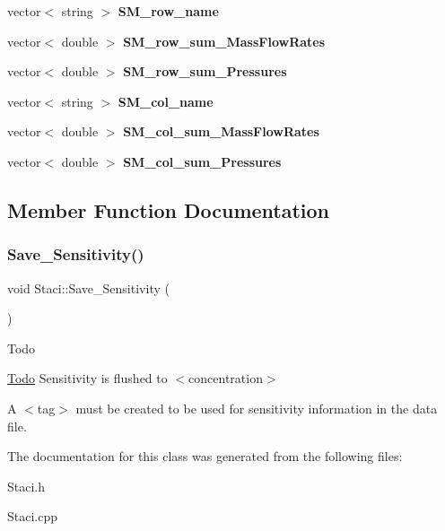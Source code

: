 \begin{DoxyCompactItemize}
vector$<$ string $>$ {\bfseries S\+M\+\_\+row\+\_\+name}
\item 
\mbox{\label{class_staci_a7b12823f45158095f1dada4da44196a5}} 
vector$<$ double $>$ {\bfseries S\+M\+\_\+row\+\_\+sum\+\_\+\+Mass\+Flow\+Rates}
\item 
\mbox{\label{class_staci_a3583d4f48a560fc7d690ce23bf2a0b99}} 
vector$<$ double $>$ {\bfseries S\+M\+\_\+row\+\_\+sum\+\_\+\+Pressures}
\item 
\mbox{\label{class_staci_a65be5fdc061a8b906b12758fae210cef}} 
vector$<$ string $>$ {\bfseries S\+M\+\_\+col\+\_\+name}
\item 
\mbox{\label{class_staci_a88c1be986fb791fc2d6dcf188e492ee4}} 
vector$<$ double $>$ {\bfseries S\+M\+\_\+col\+\_\+sum\+\_\+\+Mass\+Flow\+Rates}
\item 
\mbox{\label{class_staci_af7abda3370dc818d72e570aa2f5e9225}} 
vector$<$ double $>$ {\bfseries S\+M\+\_\+col\+\_\+sum\+\_\+\+Pressures}
\end{DoxyCompactItemize}


\subsection{Member Function Documentation}
\mbox{\label{class_staci_adfa2f37ff32dedbb4f71df48951ed786}} 
\subsubsection{\texorpdfstring{Save\+\_\+\+Sensitivity()}{Save\_Sensitivity()}}
{\footnotesize\ttfamily void Staci\+::\+Save\+\_\+\+Sensitivity (\begin{DoxyParamCaption}{ }\end{DoxyParamCaption})}

\begin{DoxyRefDesc}{Todo}
\item[\hyperlink{todo__todo000001}{Todo}]Sensitivity is flushed to $<$concentration$>$\end{DoxyRefDesc}


A $<$tag$>$ must be created to be used for sensitivity information in the data file.

The documentation for this class was generated from the following files\+:\begin{DoxyCompactItemize}
\item 
Staci.\+h\item 
Staci.\+cpp\end{DoxyCompactItemize}
